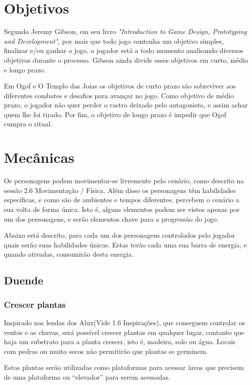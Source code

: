\section{Objetivos}

Segundo Jeremy Gibson, em seu livro \textit{"Introduction to Game Design, Prototyping and Development"}, por mais que todo jogo contenha um objetivo simples, finalizar e/ou ganhar o jogo, o jogador está a todo momento analisando diversos objetivos durante o processo. Gibson ainda divide esses objetivos em curto, médio e longo prazo. \cite{gibson2014}

Em Ogof e O Templo das Joias os objetivos de curto prazo são sobreviver aos diferentes combates e desafios para avançar no jogo. Como objetivo de médio prazo, o jogador não quer perder o rastro deixado pelo antagonista, e assim achar quem lhe foi tirado. Por fim, o objetivo de longo prazo é impedir que Ogof cumpra o ritual.

\section{Mecânicas}

Os personagens podem movimentar-se livremente pelo cenário, como descrito na sessão 2.6 Movimentação / Física. Além disso os personagens têm habilidades específicas, e como são de ambientes e tempos diferentes, percebem o cenário a sua volta de forma única. Isto é, alguns elementos podem ser vistos apenas por um dos personagens, e serão elementos chave para a progressão do jogo.

Abaixo está descrito, para cada um dos personagens controlados pelo jogador quais serão suas habilidades únicas. Estas terão cada uma sua barra de energia, e quando ativadas, consumirão desta energia.

\subsection{Duende}
\subsubsection{Crescer plantas}
Inspirado nas lendas dos Alux(Vide 1.6 Inspirações), que conseguem controlar os ventos e as chuvas, será possível crescer plantas em qualquer lugar, contanto que haja um substrato para a planta crescer, isto é,  madeira, solo ou água. Locais com pedras ou muito secos não permitirão que plantas se germinem.

Estas plantas serão utilizadas como plataformas para acessar áreas que precisem de uma plataforma ou ``elevador'' para serem acessadas.

